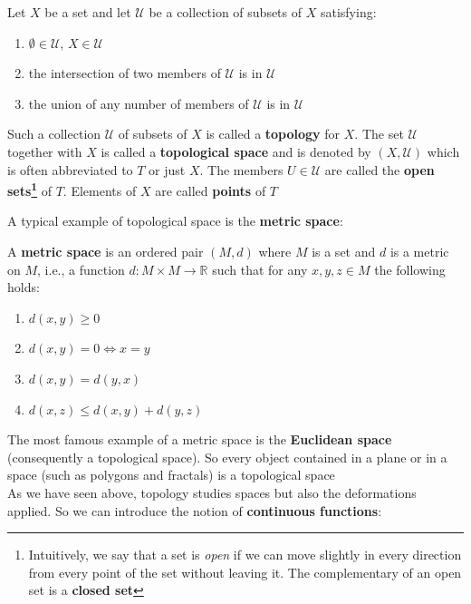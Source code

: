\begin{definition}
 Let $X$ be a set and let $\mathcal{U}$ be a collection of subsets of $X$ satisfying:
 \begin{enumerate}
  \item $\emptyset \in \mathcal{U}$, $X \in \mathcal{U}$
  \item the intersection of two members of $\mathcal{U}$ is in $\mathcal{U}$
  \item the union of any number of members of $\mathcal{U}$ is in $\mathcal{U}$
 \end{enumerate}
 Such a collection $\mathcal{U}$ of subsets of $X$ is called a \textbf{topology} for $X$. The set $\mathcal{U}$ together with $X$ is called a \textbf{topological space} and is denoted by $(X,\mathcal{U})$ which is often abbreviated to $T$ or just $X$. The members $U \in \mathcal{U}$ are called the \textbf{open sets\footnote{Intuitively, we say that a set is \textit{open} if we can move slightly in every direction from every point of the set without leaving it. The complementary of an open set is a \textbf{closed set}}} of $T$. Elements of $X$ are called \textbf{points} of $T$
\end{definition}

A typical example of topological space is the \textbf{metric space}:

\begin{definition}
 A \textbf{metric space} is an ordered pair $(M, d)$ where $M$ is a set and $d$ is a metric on $M$, i.e., a function $d \colon M \times M \to \mathbb{R}$ such that for any $x,y,z \in M$ the following holds:
 \begin{enumerate}
  \item $d(x,y) \ge 0$
  \item $d(x,y) = 0 \iff x = y$
  \item $d(x,y) = d(y,x)$
  \item $d(x,z) \le d(x,y) + d(y,z)$
 \end{enumerate}
\end{definition}

The most famous example of a metric space is the \textbf{Euclidean space} (consequently a topological space). So every object contained in a plane or in a space (such as polygons and fractals) is a topological space\\

As we have seen above, topology studies spaces but also the deformations applied. So we can introduce the notion of \textbf{continuous functions}:

